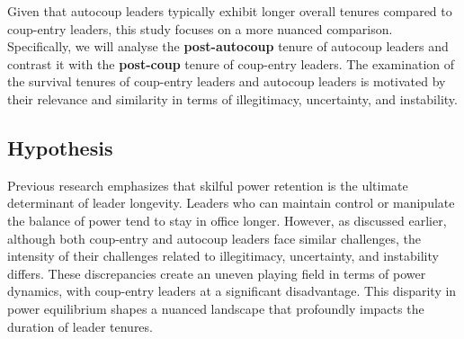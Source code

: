 \documentclass[
  12pt,
]{report}
\begin{document}
Given that autocoup leaders typically exhibit longer overall tenures
compared to coup-entry leaders, this study focuses on a more nuanced
comparison. Specifically, we will analyse the \textbf{post-autocoup}
tenure of autocoup leaders and contrast it with the \textbf{post-coup}
tenure of coup-entry leaders. The examination of the survival tenures of
coup-entry leaders and autocoup leaders is motivated by their relevance
and similarity in terms of illegitimacy, uncertainty, and instability.

\subsection{Hypothesis}\label{hypothesis}

Previous research emphasizes that skilful power retention is the
ultimate determinant of leader longevity. Leaders who can maintain
control or manipulate the balance of power tend to stay in office
longer. However, as discussed earlier, although both coup-entry and
autocoup leaders face similar challenges, the intensity of their
challenges related to illegitimacy, uncertainty, and instability
differs. These discrepancies create an uneven playing field in terms of
power dynamics, with coup-entry leaders at a significant disadvantage.
This disparity in power equilibrium shapes a nuanced landscape that
profoundly impacts the duration of leader tenures.
\end{document}
